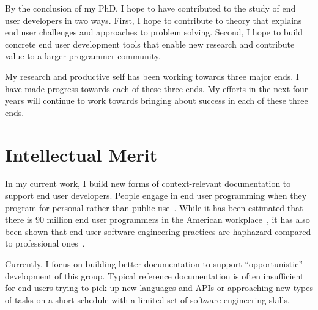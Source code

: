 \documentclass[12pt]{memoir}
\begin{document}
By the conclusion of my PhD, I hope to have contributed to the study of end user developers in two ways.
First, I hope to contribute to theory that explains end user challenges and approaches to problem solving.
Second, I hope to build concrete end user development tools that enable new research and contribute value to a larger programmer community.


My research and productive self has been working towards three major ends.
I have made progress towards each of these three ends.
My efforts in the next four years will continue to work towards bringing about success in each of these three ends.
\fi

\section{Intellectual Merit}

In my current work, I build new forms of context-relevant documentation to support end user developers.
People engage in end user programming when they program for personal rather than public use~\cite{ko_state_2011}.
While it has been estimated that there is 90 million end user programmers in the American workplace~\cite{scaffidi_estimating_2005}, it has also been shown that end user software engineering practices are haphazard compared to professional ones~\cite{ko_state_2011}.

Currently, I focus on building better documentation to support ``opportunistic''~\cite{clarke_what_2007} development of this group.
Typical reference documentation is often insufficient for end users trying to pick up new languages and APIs or approaching new types of tasks on a short schedule with a limited set of software engineering skills.
\end{document}
